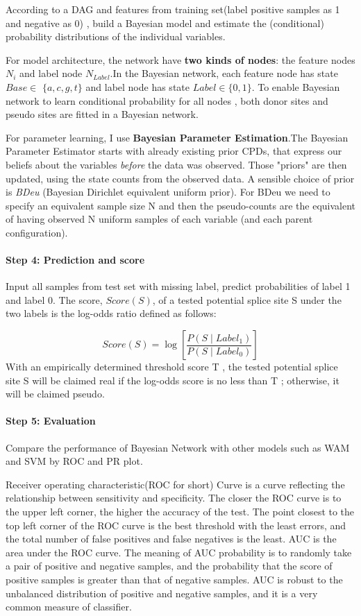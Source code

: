 \documentclass{gapd}
\begin{document}
According to a DAG and features from training set(label positive samples
as 1 and negative as 0) , build a Bayesian model and estimate the
(conditional) probability distributions of the individual variables.

For model architecture, the network have \textbf{two kinds of nodes}:
the feature nodes \(N_i\) and label node \(N_{Label}\).In the Bayesian
network, each feature node has state \({Base} \in\) \(\{a, c, g, t\}\)
and label node has state \({Label} \in\{0,1\}\). To enable Bayesian
network to learn conditional probability for all nodes , both donor
sites and pseudo sites are fitted in a Bayesian network.

For parameter learning, I use \textbf{Bayesian Parameter Estimation}.The
Bayesian Parameter Estimator starts with already existing prior CPDs,
that express our beliefs about the variables \emph{before} the data was
observed. Those "priors" are then updated, using the state counts from
the observed data. A sensible choice of prior is \emph{BDeu} (Bayesian
Dirichlet equivalent uniform prior). For BDeu we need to specify an
equivalent sample size N and then the pseudo-counts are the equivalent
of having observed N uniform samples of each variable (and each parent
configuration).

\paragraph{Step 4: Prediction and score}\label{prediction-and-score}

Input all samples from test set with missing label, predict
probabilities of label 1 and label 0. The score, \(Score(S)\), of a
tested potential splice site S under the two labels is the log-odds
ratio defined as follows:

\[Score(S)=\log \left[\frac{P\left(S \mid Label_{\mathrm{1}}\right)}{P\left(S \mid Label_{\mathrm{0}}\right)}\right]\]
With an empirically determined threshold score T , the tested potential
splice site S will be claimed real if the log-odds score is no less than
T ; otherwise, it will be claimed pseudo.

\paragraph{Step 5: Evaluation}\label{evaluation}

Compare the performance of Bayesian Network with other models such as
WAM and SVM by ROC and PR plot.

Receiver operating characteristic(ROC for short) Curve is a curve
reflecting the relationship between sensitivity and specificity. The
closer the ROC curve is to the upper left corner, the higher the
accuracy of the test. The point closest to the top left corner of the
ROC curve is the best threshold with the least errors, and the total
number of false positives and false negatives is the least. AUC is the
area under the ROC curve. The meaning of AUC probability is to randomly
take a pair of positive and negative samples, and the probability that
the score of positive samples is greater than that of negative samples.
AUC is robust to the unbalanced distribution of positive and negative
samples, and it is a very common measure of classifier.
\end{document}
